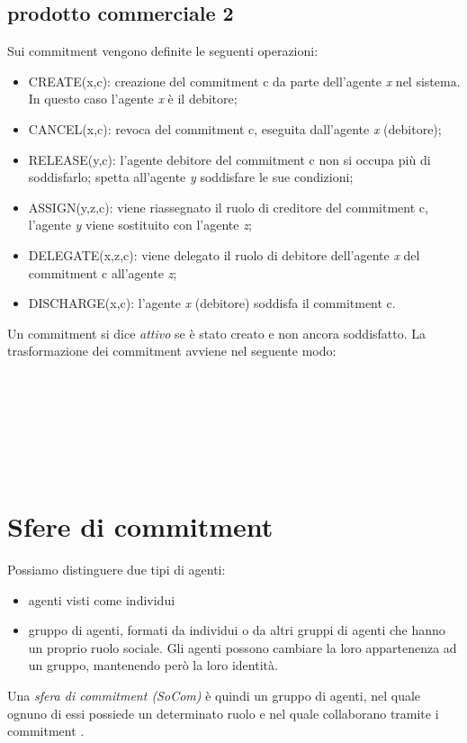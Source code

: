 \documentclass[a4paper,12pt]{report}
\begin{document}
\subsection{prodotto commerciale 2}
Sui commitment vengono definite le seguenti operazioni:
\begin{itemize}
    \item CREATE(x,c): creazione del commitment c da parte dell'agente \textit{x} nel sistema. In questo caso l'agente \textit{x} è il debitore;
    \item CANCEL(x,c): revoca del commitment c, eseguita dall'agente \textit{x} (debitore);
    \item RELEASE(y,c): l'agente debitore del commitment c non si occupa più di soddisfarlo; spetta all'agente \textit{y} soddisfare le sue condizioni;
    \item ASSIGN(y,z,c): viene riassegnato il ruolo di creditore del commitment c, l'agente \textit{y} viene sostituito con l'agente \textit{z};
    \item DELEGATE(x,z,c): viene delegato il ruolo di debitore dell'agente \textit{x} del commitment c all'agente \textit{z};
    \item DISCHARGE(x,c): l'agente \textit{x} (debitore) soddisfa il commitment c.
\end{itemize}
\newpage
Un commitment si dice \textit{attivo} se è stato creato e non ancora soddisfatto.
La trasformazione dei commitment avviene nel seguente modo:\\
\\
\begin{inparaenum}[1)] 
    \item {}\\ \\
    \item {}\\ \\
    \item {}
\end{inparaenum}
\section{Sfere di commitment}
Possiamo distinguere due tipi di agenti:
\begin{itemize}
    \item agenti visti come individui
    \item gruppo di agenti, formati da individui o da altri gruppi di agenti che hanno un proprio ruolo sociale. Gli agenti possono cambiare la loro appartenenza ad un gruppo, mantenendo però la loro identità.
\end{itemize}
Una \textit{sfera di commitment (SoCom)} è quindi un gruppo di agenti, nel quale ognuno di essi possiede un determinato ruolo e nel quale collaborano tramite i commitment \cite{rif2}.
\end{document}
